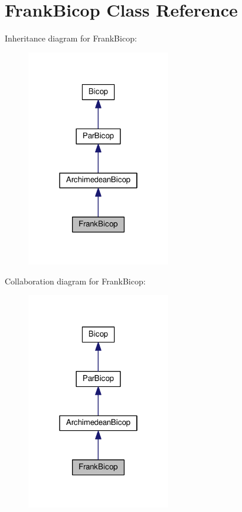 \hypertarget{class_frank_bicop}{}\section{Frank\+Bicop Class Reference}
\label{class_frank_bicop}


Inheritance diagram for Frank\+Bicop\+:\nopagebreak
\begin{figure}[H]
\begin{center}
\leavevmode
\includegraphics[width=178pt]{class_frank_bicop__inherit__graph}
\end{center}
\end{figure}


Collaboration diagram for Frank\+Bicop\+:\nopagebreak
\begin{figure}[H]
\begin{center}
\leavevmode
\includegraphics[width=178pt]{class_frank_bicop__coll__graph}
\end{center}
\end{figure}
